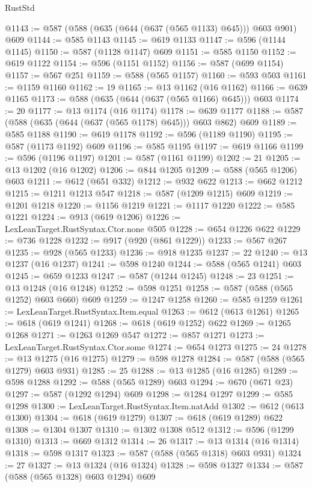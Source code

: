 \begin{lexlean}{RustStd}
\begin{coremodule}
@1143 := @587 (@588 (@635 (@644 (@637 (@565 @1133) @645))) @603 @901) @609
@1144 := @585 @1143
@1145 := @619 @1133
@1147 := @596 (@1144 @1145)
@1150 := @587 (@1128 @1147) @609
@1151 := @585 @1150
@1152 := @619 @1122
@1154 := @596 (@1151 @1152)
@1156 := @587 (@699 @1154)
@1157 := @567 @251
@1159 := @588 (@565 @1157)
@1160 := @593 @503
@1161 := @1159 @1160
@1162 := 19
@1165 := @13 @1162 (@16 @1162)
@1166 := @639 @1165
@1173 := @588 (@635 (@644 (@637 (@565 @1166) @645))) @603
@1174 := 20
@1177 := @13 @1174 (@16 @1174)
@1178 := @639 @1177
@1188 := @587 (@588 (@635 (@644 (@637 (@565 @1178) @645))) @603 @862) @609
@1189 := @585 @1188
@1190 := @619 @1178
@1192 := @596 (@1189 @1190)
@1195 := @587 (@1173 @1192) @609
@1196 := @585 @1195
@1197 := @619 @1166
@1199 := @596 (@1196 @1197)
@1201 := @587 (@1161 @1199)
@1202 := 21
@1205 := @13 @1202 (@16 @1202)
@1206 := @844 @1205
@1209 := @588 (@565 @1206) @603
@1211 := @612 (@651 @332)
@1212 := @932 @622
@1213 := @662 @1212
@1215 := @1211 @1213 @547
@1218 := @587 (@1209 @1215) @609
@1219 := @1201 @1218
@1220 := @1156 @1219
@1221 := @1117 @1220
@1222 := @585 @1221
@1224 := @913 (@619 @1206)
@1226 := LexLeanTarget.RustSyntax.Ctor.none @505
@1228 := @654 @1226 @622
@1229 := @736 @1228
@1232 := @917 (@920 (@861 @1229))
@1233 := @567 @267
@1235 := @928 (@565 @1233)
@1236 := @918 @1235
@1237 := 22
@1240 := @13 @1237 (@16 @1237)
@1241 := @598 @1240
@1244 := @588 (@565 @1241) @603
@1245 := @659 @1233
@1247 := @587 (@1244 @1245)
@1248 := 23
@1251 := @13 @1248 (@16 @1248)
@1252 := @598 @1251
@1258 := @587 (@588 (@565 @1252) @603 @660) @609
@1259 := @1247 @1258
@1260 := @585 @1259
@1261 := LexLeanTarget.RustSyntax.Item.equal
@1263 := @612 (@613 @1261)
@1265 := @618 (@619 @1241)
@1268 := @618 (@619 @1252) @622
@1269 := @1265 @1268
@1271 := @1263 @1269 @547
@1272 := @857 @1271
@1273 := LexLeanTarget.RustSyntax.Ctor.some
@1274 := @654 @1273
@1275 := 24
@1278 := @13 @1275 (@16 @1275)
@1279 := @598 @1278
@1284 := @587 (@588 (@565 @1279) @603 @931)
@1285 := 25
@1288 := @13 @1285 (@16 @1285)
@1289 := @598 @1288
@1292 := @588 (@565 @1289) @603
@1294 := @670 (@671 @23)
@1297 := @587 (@1292 @1294) @609
@1298 := @1284 @1297
@1299 := @585 @1298
@1300 := LexLeanTarget.RustSyntax.Item.natAdd
@1302 := @612 (@613 @1300)
@1304 := @618 (@619 @1279)
@1307 := @618 (@619 @1289) @622
@1308 := @1304 @1307
@1310 := @1302 @1308 @512
@1312 := @596 (@1299 @1310)
@1313 := @669 @1312
@1314 := 26
@1317 := @13 @1314 (@16 @1314)
@1318 := @598 @1317
@1323 := @587 (@588 (@565 @1318) @603 @931)
@1324 := 27
@1327 := @13 @1324 (@16 @1324)
@1328 := @598 @1327
@1334 := @587 (@588 (@565 @1328) @603 @1294) @609

\end{coremodule}
\end{lexlean}
